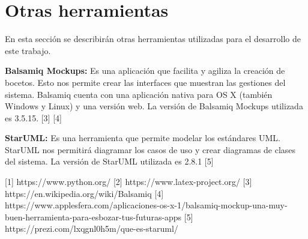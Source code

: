	\section{Otras herramientas}
		En esta sección se describirán otras herramientas utilizadas para el desarrollo de este trabajo.
		
		\textbf{Balsamiq Mockups:} Es una aplicación que facilita y agiliza la creación de bocetos. Esto nos permite crear las interfaces que muestran las gestiones del sistema. Balsamiq cuenta con una aplicación nativa para OS X (también Windows y Linux) y una versión web. La versión de Balsamiq Mockups utilizada es 3.5.15. [3] [4]
		
		\textbf{StarUML:} Es una herramienta que permite modelar los estándares UML. StarUML nos permitirá diagramar los casos de uso y crear diagramas de clases del sistema. La versión de StarUML utilizada es 2.8.1 [5]
		
		
	
	


[1] https://www.python.org/
[2] https://www.latex-project.org/
[3] https://en.wikipedia.org/wiki/Balsamiq 
[4] https://www.applesfera.com/aplicaciones-os-x-1/balsamiq-mockup-una-muy-buen-herramienta-para-esbozar-tus-futuras-apps
[5] https://prezi.com/lxqgnl0h5m/que-es-staruml/